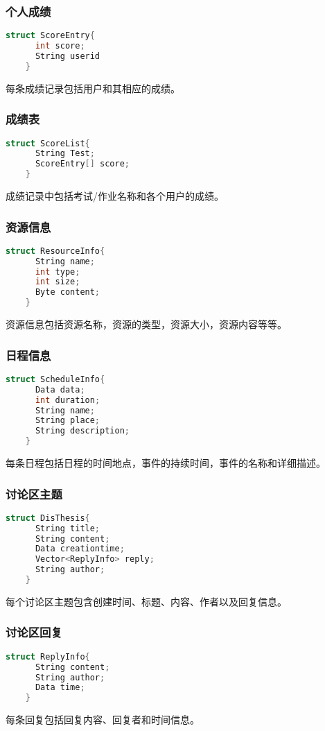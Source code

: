   \subsubsection{个人成绩}
  \begin{lstlisting}[language=C,caption=个人成绩]
    struct ScoreEntry{
      int score;
      String userid
    }
  \end{lstlisting}
  每条成绩记录包括用户和其相应的成绩。
  \subsubsection{成绩表}
  \begin{lstlisting}[language=C,caption=成绩表]
    struct ScoreList{
      String Test;
      ScoreEntry[] score;
    }
  \end{lstlisting}
  成绩记录中包括考试/作业名称和各个用户的成绩。
  \subsubsection{资源信息}
  \begin{lstlisting}[language=C,caption=资源信息]
    struct ResourceInfo{
      String name;
      int type;
      int size;
      Byte content;
    }
  \end{lstlisting}
  资源信息包括资源名称，资源的类型，资源大小，资源内容等等。
  \subsubsection{日程信息}
  \begin{lstlisting}[language=C,caption=日程信息]
    struct ScheduleInfo{
      Data data;
      int duration;
      String name;
      String place;
      String description;
    }
  \end{lstlisting}
  每条日程包括日程的时间地点，事件的持续时间，事件的名称和详细描述。
  \subsubsection{讨论区主题}
  \begin{lstlisting}[language=C,caption=讨论区主题]
    struct DisThesis{
      String title;
      String content;
      Data creationtime;
      Vector<ReplyInfo> reply;
      String author;
    }
  \end{lstlisting}
  每个讨论区主题包含创建时间、标题、内容、作者以及回复信息。
  \subsubsection{讨论区回复}
  \begin{lstlisting}[language=C,caption=讨论区回复]
    struct ReplyInfo{
      String content;
      String author;
      Data time;
    }
  \end{lstlisting}
  每条回复包括回复内容、回复者和时间信息。
